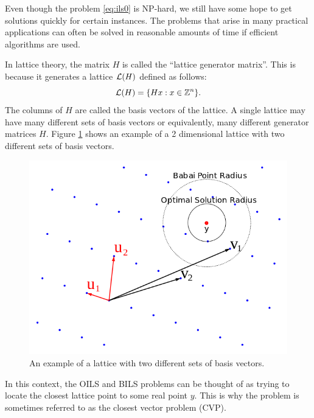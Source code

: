 \documentclass[12pt,Bold,letterpaper]{mcgilletdclass}
\begin{document}
Even though the problem \eqref{eq:ils0} is NP-hard, we still have some hope to get solutions
quickly for certain instances. The problems that arise in many practical applications can often be solved in reasonable amounts of time if efficient algorithms are used.

In lattice theory, the matrix $H$ is called the ``lattice generator matrix''. This is because it generates a lattice ${\cal{L}}(H)$ defined as follows:
\begin{equation}
{\cal{L}}(H) = \{Hx: x\in \mathbb{Z}^n\}.
\end{equation}
The columns of $H$ are called the basis vectors of the lattice. A single lattice may have many different sets of basis vectors or equivalently, many different generator matrices $H$. Figure \ref{fig:latticeBasis} shows an example of a 2 dimensional lattice with two different sets of basis vectors.

\begin{figure}
\centering
\includegraphics[scale=0.4]{latticebasis.png}
\caption{An example of a lattice with two different sets of basis vectors.}
\label{fig:latticeBasis}
\end{figure}

In this context, the OILS and BILS problems can be thought of as trying to locate the closest lattice point to some real point $y$. This is why the problem is sometimes referred to as the closest vector problem (CVP).
\end{document}
